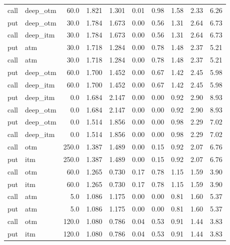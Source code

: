 \begin{longtable}{llrrrrrrrr}
 call &  deep\_otm &      60.0 & 1.821 & 1.301 &    0.01 &    0.98 &   1.58 &    2.33 &    6.26 \\
  put &  deep\_otm &      30.0 & 1.784 & 1.673 &    0.00 &    0.56 &   1.31 &    2.64 &    6.73 \\
 call &  deep\_itm &      30.0 & 1.784 & 1.673 &    0.00 &    0.56 &   1.31 &    2.64 &    6.73 \\
  put &       atm &      30.0 & 1.718 & 1.284 &    0.00 &    0.78 &   1.48 &    2.37 &    5.21 \\
 call &       atm &      30.0 & 1.718 & 1.284 &    0.00 &    0.78 &   1.48 &    2.37 &    5.21 \\
  put &  deep\_otm &      60.0 & 1.700 & 1.452 &    0.00 &    0.67 &   1.42 &    2.45 &    5.98 \\
 call &  deep\_itm &      60.0 & 1.700 & 1.452 &    0.00 &    0.67 &   1.42 &    2.45 &    5.98 \\
  put &  deep\_itm &       0.0 & 1.684 & 2.147 &    0.00 &    0.00 &   0.92 &    2.90 &    8.93 \\
 call &  deep\_otm &       0.0 & 1.684 & 2.147 &    0.00 &    0.00 &   0.92 &    2.90 &    8.93 \\
  put &  deep\_otm &       0.0 & 1.514 & 1.856 &    0.00 &    0.00 &   0.98 &    2.29 &    7.02 \\
 call &  deep\_itm &       0.0 & 1.514 & 1.856 &    0.00 &    0.00 &   0.98 &    2.29 &    7.02 \\
 call &       otm &     250.0 & 1.387 & 1.489 &    0.00 &    0.15 &   0.92 &    2.07 &    6.76 \\
  put &       itm &     250.0 & 1.387 & 1.489 &    0.00 &    0.15 &   0.92 &    2.07 &    6.76 \\
 call &       otm &      60.0 & 1.265 & 0.730 &    0.17 &    0.78 &   1.15 &    1.59 &    3.90 \\
  put &       itm &      60.0 & 1.265 & 0.730 &    0.17 &    0.78 &   1.15 &    1.59 &    3.90 \\
 call &       atm &       5.0 & 1.086 & 1.175 &    0.00 &    0.00 &   0.81 &    1.60 &    5.37 \\
  put &       atm &       5.0 & 1.086 & 1.175 &    0.00 &    0.00 &   0.81 &    1.60 &    5.37 \\
 call &       otm &     120.0 & 1.080 & 0.786 &    0.04 &    0.53 &   0.91 &    1.44 &    3.83 \\
  put &       itm &     120.0 & 1.080 & 0.786 &    0.04 &    0.53 &   0.91 &    1.44 &    3.83 \\

\end{longtable}
